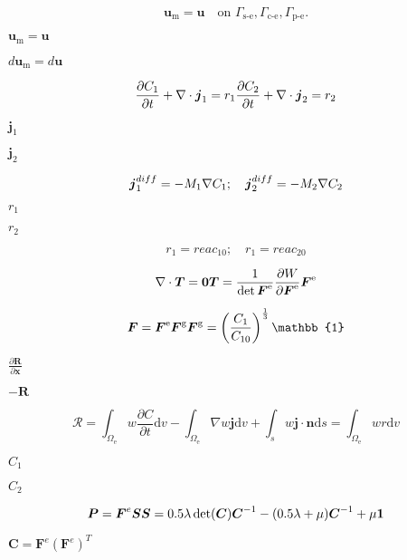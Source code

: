\documentclass{article}
\begin{document}
\[ \boldsymbol{u}_\text{m}=\boldsymbol{u} \quad \text{on } \Gamma_\text{s-e}, \Gamma_\text{c-e}, \Gamma_\text{p-e}. \]
\pagebreak

$\boldsymbol{u}_\text{m}=\boldsymbol{u}$
\pagebreak

$d\boldsymbol{u}_\text{m}=d\boldsymbol{u}$
\pagebreak

\[ \frac{\partial C_\text{1}}{\partial t}+\nabla\cdot\boldsymbol{j}_1=r_1 \\ \frac{\partial C_\text{2}}{\partial t}+\nabla\cdot\boldsymbol{j}_2=r_2 \]
\pagebreak

$\boldsymbol{j}_1 $
\pagebreak

$\boldsymbol{j}_2 $
\pagebreak

\[ \boldsymbol{j}_1^{diff}=-M_1\nabla C_\text{1}; \quad \boldsymbol{j}_2^{diff}=-M_2\nabla C_\text{2}\\ \]
\pagebreak

$r_1$
\pagebreak

$r_2$
\pagebreak

\[ r_1= reac_{10}; \quad r_1= reac_{20} \]
\pagebreak

\[ \nabla\cdot\boldsymbol{T} = \boldsymbol{0}\\ \boldsymbol{T}= \frac{1}{\det{\boldsymbol{F}^{\text{e}}}}\frac{\partial W}{\partial \boldsymbol{F}^{\text{e}}}\boldsymbol{F}^{\text{e}} \]
\pagebreak

\[ \boldsymbol{F}=\boldsymbol{F}^{\text{e}}\boldsymbol{F}^{\text{g}}\\ \boldsymbol{F}^{\text{g}}=\left(\frac{C_\text{1}}{C_\text{10}}\right)^{\frac{1}{3}}\mathbb{1} \]
\pagebreak

$\frac{\partial \boldsymbol{R}}{\partial \boldsymbol{x}} $
\pagebreak

$-\boldsymbol{R}$
\pagebreak

\[ \mathscr{R}=\int_{\Omega_{\text{e}}}w\frac{\partial C}{\partial t}\text{d}v-\int_{\Omega_{\text{e}}} \nabla w \boldsymbol{j} \text{d}v+\int_{s}w\boldsymbol{j}\cdot\boldsymbol{n} \text{d}s=\int_{\Omega_{\text{e}}}w r \text{d}v \]
\pagebreak

$C_\text{1}$
\pagebreak

$C_\text{2}$
\pagebreak

\[ \boldsymbol{P}=\boldsymbol{F}^e\boldsymbol{S}\\ \boldsymbol{S}=0.5\lambda\det(\boldsymbol{C})\boldsymbol{C}^{-1}-(0.5\lambda+\mu)\boldsymbol{C}^{-1}+\mu\boldsymbol{1} \]
\pagebreak

$\boldsymbol{C}=\boldsymbol{F}^e(\boldsymbol{F}^e)^{T}$
\pagebreak
\end{document}
